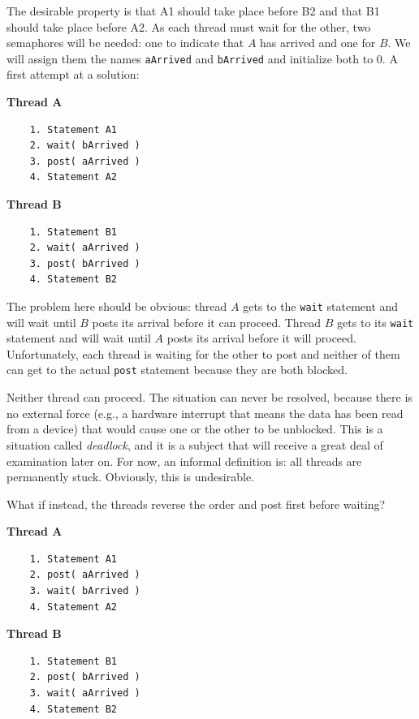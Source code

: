 \documentclass[a4paper]{report}
\begin{document}
The desirable property is that A1 should take place before B2 and that B1 should take place before A2. As each thread must wait for the other, two semaphores will be needed: one to indicate that $A$ has arrived and one for $B$. We will assign them the names \texttt{aArrived} and \texttt{bArrived} and initialize both to 0. A first attempt at a solution:

\begin{multicols}{2}
	\textbf{Thread A}\vspace{-2em}
	\begin{verbatim}
	1. Statement A1
	2. wait( bArrived )
	3. post( aArrived )
	4. Statement A2
  \end{verbatim}
	\columnbreak
	\textbf{Thread B}\vspace{-2em}
	\begin{verbatim}
	1. Statement B1
	2. wait( aArrived )
	3. post( bArrived )
	4. Statement B2
  \end{verbatim}
\end{multicols}
\vspace{-2em}


The problem here should be obvious: thread $A$ gets to the \texttt{wait} statement and will wait until $B$ posts its arrival before it can proceed. Thread $B$ gets to its \texttt{wait} statement and will wait until $A$ posts its arrival before it will proceed. Unfortunately, each thread is waiting for the other to post and neither of them can get to the actual \texttt{post} statement because they are both blocked.

Neither thread can proceed. The situation can never be resolved, because there is no external force (e.g., a hardware interrupt that means the data has been read from a device) that would cause one or the other to be unblocked. This is a situation called \textit{deadlock}, and it is a subject that will receive a great deal of examination later on. For now, an informal definition is: all threads are permanently stuck. Obviously, this is undesirable.

What if instead, the threads reverse the order and post first before waiting?

\begin{multicols}{2}
	\textbf{Thread A}\vspace{-2em}
	\begin{verbatim}
	1. Statement A1
	2. post( aArrived )
	3. wait( bArrived )
	4. Statement A2
  \end{verbatim}
	\columnbreak
	\textbf{Thread B}\vspace{-2em}
	\begin{verbatim}
	1. Statement B1
	2. post( bArrived )
	3. wait( aArrived )
	4. Statement B2
  \end{verbatim}
\end{multicols}
\vspace{-2em}
\end{document}
